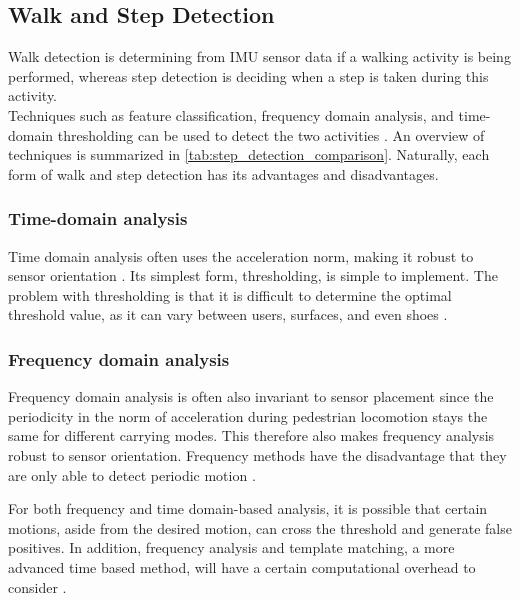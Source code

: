 \subsection{Walk and Step Detection}
\label{sec:rw - step detection}
Walk detection is determining from \ac{IMU} sensor data if a walking activity is being performed, whereas step detection is deciding when a step is taken during this activity. \\
Techniques such as feature classification, frequency domain analysis, and time-domain thresholding can be used to detect the two activities \cite{Yang2014}. An overview of techniques  is summarized in \cref{tab:step_detection_comparison}. Naturally, each form of walk and step detection has its advantages and disadvantages.\par

\subsubsection{Time-domain analysis}
 Time domain analysis often uses the acceleration norm, making it robust to sensor orientation \cite{Davidson2017}. Its simplest form, thresholding, is simple to implement. The problem with thresholding is that it is difficult to determine the optimal threshold value, as it can vary between users, surfaces, and even shoes \cite{Brajdic2013}.  

\subsubsection{Frequency domain analysis} 
Frequency domain analysis is often  also invariant to sensor placement \cite{Brajdic2013} since the periodicity in the norm of acceleration during pedestrian locomotion stays the same for different carrying modes. This therefore also makes frequency analysis robust to sensor orientation. Frequency methods have the disadvantage that they are only able to detect periodic motion \cite{Davidson2017}. \par 

For both frequency and time domain-based analysis, it is possible that certain motions, aside from the desired motion, can cross the threshold and generate false positives. In addition, frequency analysis and template matching, a more advanced time based method, will have a certain computational overhead to consider \cite{Davidson2017, Harle2013}. 

